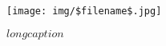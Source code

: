 \begin{figure}%
  \centering
  \texttt{[image: img/\$filename\$.jpg]}
  \caption[$short caption$]{$long caption$}
  \label{fig:$label$}
\end{figure}
